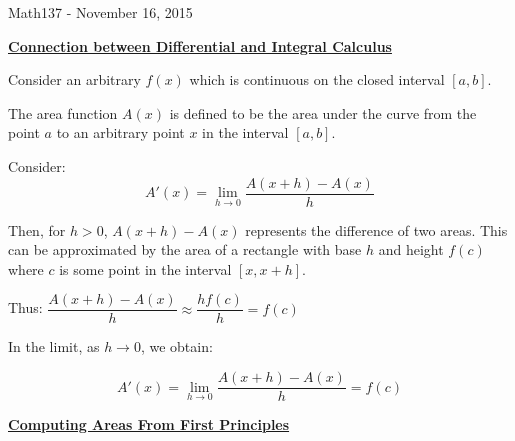 \documentclass{letter}
\begin{document}
	\begin{center}
		\LARGE Math137 - November 16, 2015\\
		\large 
	\end{center}
	\vspace{0.25 in}
	\underline{\textbf{Connection between Differential and Integral Calculus}}
	
	Consider an arbitrary $f(x)$ which is continuous on the closed interval $[a, b]$.
	
	The area function $A(x)$  is defined to be the area under the curve from the point $a$ to an arbitrary point $x$ in the interval $[a, b]$.
	
	Consider: \[ A'(x) = \lim_{h \to 0} \frac{A(x + h) - A(x)}{h} \]
	
	Then, for $h>0$, $A(x+h) -A(x)$ represents the difference of two areas. This can be approximated by the area of a rectangle with base $h$ and height $f(c)$ where $c$ is some point in the interval $[x, x+h]$.
	
	Thus: $\dfrac{A(x+h) - A(x)}{h} \approx \dfrac{h f(c)}{h} = f(c)$
	
	In the limit, as $h \to 0$, we obtain:
	
	\[ A'(x) = \lim_{h \to 0} \dfrac{A(x+h) - A(x)}{h} = f(c) \]
	
	\underline{\textbf{Computing Areas From First Principles}}
	
\end{document}
